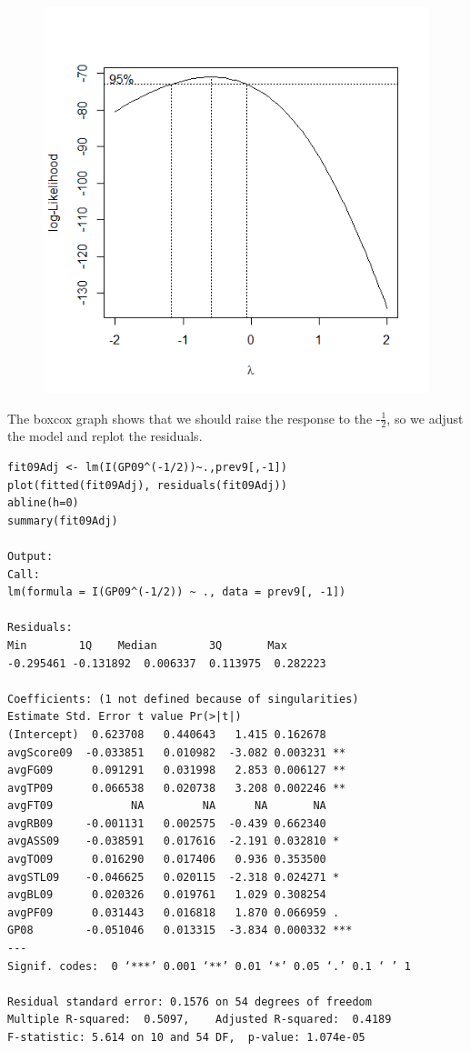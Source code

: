 \documentclass[]{scrartcl}
\begin{document}
\begin{figure}[H]
	\centering
	\includegraphics[scale=.6]{2009box.png}
\end{figure}
The boxcox graph shows that we should raise the response to the -$\frac{1}{2}$, so we adjust the model and replot the residuals.
\footnotesize
\begin{verbatim}
fit09Adj <- lm(I(GP09^(-1/2))~.,prev9[,-1])
plot(fitted(fit09Adj), residuals(fit09Adj))
abline(h=0)
summary(fit09Adj)

Output:
Call:
lm(formula = I(GP09^(-1/2)) ~ ., data = prev9[, -1])

Residuals:
Min        1Q    Median        3Q       Max 
-0.295461 -0.131892  0.006337  0.113975  0.282223 

Coefficients: (1 not defined because of singularities)
Estimate Std. Error t value Pr(>|t|)    
(Intercept)  0.623708   0.440643   1.415 0.162678    
avgScore09  -0.033851   0.010982  -3.082 0.003231 ** 
avgFG09      0.091291   0.031998   2.853 0.006127 ** 
avgTP09      0.066538   0.020738   3.208 0.002246 ** 
avgFT09            NA         NA      NA       NA    
avgRB09     -0.001131   0.002575  -0.439 0.662340    
avgASS09    -0.038591   0.017616  -2.191 0.032810 *  
avgTO09      0.016290   0.017406   0.936 0.353500    
avgSTL09    -0.046625   0.020115  -2.318 0.024271 *  
avgBL09      0.020326   0.019761   1.029 0.308254    
avgPF09      0.031443   0.016818   1.870 0.066959 .  
GP08        -0.051046   0.013315  -3.834 0.000332 ***
---
Signif. codes:  0 ‘***’ 0.001 ‘**’ 0.01 ‘*’ 0.05 ‘.’ 0.1 ‘ ’ 1

Residual standard error: 0.1576 on 54 degrees of freedom
Multiple R-squared:  0.5097,	Adjusted R-squared:  0.4189 
F-statistic: 5.614 on 10 and 54 DF,  p-value: 1.074e-05
\end{verbatim}
\end{document}
